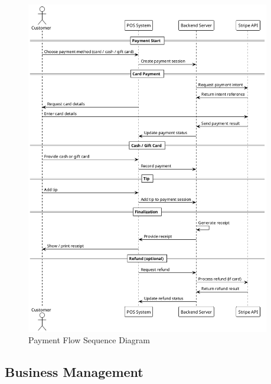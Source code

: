 \documentclass[]{VUMIFTemplateClass}
\begin{document}
\begin{figure}[H]
    \centering
    \includegraphics[width=0.95\textwidth]{images/diagrams/payment/payment_flow.png}
    \caption{Payment Flow Sequence Diagram}
    \label{fig:payment_flow}
\end{figure}

\subsection{Business Management}
\end{document}

